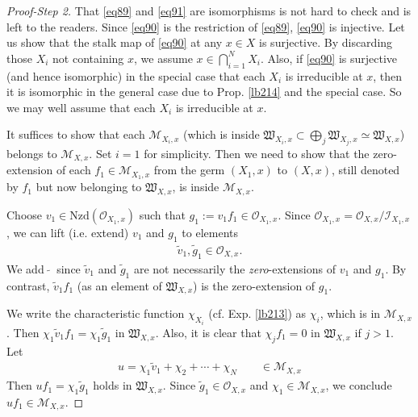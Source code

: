 \documentclass[12pt,b5paper,notitlepage]{report}
\theoremstyle{definition}
\theoremstyle{plain}
\newcommand{\fk}{\mathfrak}
\newcommand{\wtd}{\widetilde}
\newcommand{\scr}{\mathscr}
\newcommand{\Nzd}{\mathrm{Nzd}}
\numberwithin{equation}{section}
\begin{document}
\begin{proof}[Proof-Step 2]
That \eqref{eq89} and \eqref{eq91} are isomorphisms is not hard to check and is left to the readers. Since \eqref{eq90} is the restriction of \eqref{eq89}, \eqref{eq90} is injective. Let us show that the stalk map of \eqref{eq90} at any $x\in X$ is surjective. By discarding those $X_i$ not containing $x$, we assume $x\in\bigcap_{i=1}^N X_i$. Also, if \eqref{eq90} is surjective (and hence isomorphic) in the special case that each $X_i$ is irreducible at $x$, then it is isomorphic in the general case due to Prop. \ref{lb214} and the special case. So we may well assume that each $X_i$ is irreducible at $x$.

It suffices to show that each $\scr M_{X_i,x}$ (which is inside $\fk W_{X_i,x}\subset\bigoplus_j \fk W_{X_j,x}\simeq\fk W_{X,x}$) belongs to $\scr M_{X,x}$. Set $i=1$ for simplicity. Then we need to show that the zero-extension of each $f_1\in\scr M_{X_1,x}$ from the germ $(X_1,x)$ to $(X,x)$, still denoted by $f_1$ but now belonging to $\fk W_{X,x}$, is inside $\scr M_{X,x}$.



Choose $v_1\in\Nzd(\scr O_{X_1,x})$ such that $g_1:=v_1f_1\in\scr O_{X_1,x}$. Since $\scr O_{X_1,x}=\scr O_{X,x}/\scr I_{X_1,x}$, we can lift (i.e. extend) $v_1$ and $g_1$ to elements
\begin{align*}
\wtd v_1,\wtd g_1\in\scr O_{X,x}.
\end{align*}
We add $\wtd{~~}$ since $\wtd v_1$ and $\wtd g_1$ are not necessarily the \emph{zero}-extensions of $v_1$ and $g_1$. By contrast, $\wtd v_1f_1$ (as an element of $\fk W_{X,x}$) is the zero-extension of $g_1$.

We write the characteristic function $\chi_{X_i}$ (cf. Exp. \ref{lb213}) as $\chi_i$, which is in $\scr M_{X,x}$. Then $\chi_1\wtd v_1f_1=\chi_1\wtd g_1$ in $\fk W_{X,x}$. Also, it is clear that $\chi_jf_1=0$ in $\fk W_{X,x}$ if $j>1$. Let
\begin{align*}
u=\chi_1\wtd v_1+\chi_2+\cdots+\chi_N\qquad \in\scr M_{X,x}
\end{align*}
Then $uf_1=\chi_1\wtd g_1$ holds in $\fk W_{X,x}$. Since $\wtd g_1\in\scr O_{X,x}$ and $\chi_1\in\scr M_{X,x}$, we conclude $uf_1\in\scr M_{X,x}$.




\end{proof}
\end{document}
